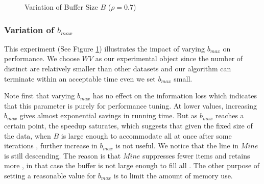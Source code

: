 \begin{figure}[th]
\flushleft
{}
\caption{Variation of Buffer Size $B$ ($\rho=0.7$)}\label{fig:buffersize}
\end{figure}


\subsubsection{Variation of $b_{max}$}\label{sec:eval:buffersize}

This experiment (See Figure \ref{fig:buffersize}) illustrates the impact of varying $b_{max}$ on performance.
We choose $WV$ as our experimental object since the number of
distinct \qids are relatively smaller than other datasets and our algorithm
can terminate within an acceptable time even we set $b_{max}$   small.

Note first that varying $b_{max}$ has no effect on the information loss which
indicates that this parameter is purely for performance tuning.
At lower values, increasing $b_{max}$ gives almost exponential
savings in running time. But as $b_{max}$ reaches a certain point, the speedup
saturates, which suggests that given the fixed size of the data,
when $B$ is large enough to accommodate all \qids at once after some iterations
, further increase in $b_{max}$ is not useful.
We notice that the line in $Mine$ is still descending. The reason is that
$Mine$ suppresses fewer items and retains more \qids, in that case the buffer is
not large enough to fill all \qids.
The other purpose of setting a reasonable value for $b_{max}$ is to limit the
amount of memory use.

